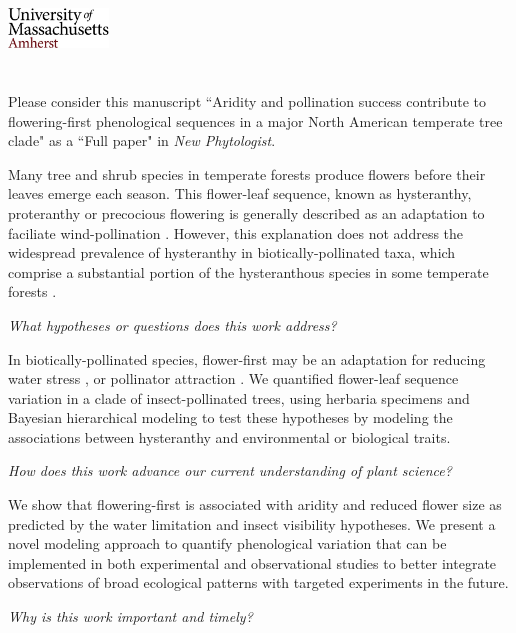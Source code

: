\documentclass{article}[12pt]
\begin{document}

\noindent\includegraphics[width=0.2\textwidth]{umasslogo}\\\\

\\


\noindent Please consider this manuscript ``Aridity and pollination success contribute to flowering-first phenological sequences in a major North American temperate tree clade" as a ``Full paper" in \textit{New Phytologist}.

\noindent Many tree and shrub species in temperate forests produce flowers before their leaves emerge each season. This flower-leaf sequence, known as hysteranthy, proteranthy or precocious flowering is generally described as an adaptation to faciliate wind-pollination \citep{Rathcke_1985}. However, this explanation does not address the widespread prevalence of hysteranthy in biotically-pollinated taxa, which comprise a substantial portion of the hysteranthous species in some temperate forests \citep{Buonaiuto2020}. 

\noindent \emph{What hypotheses or questions does this work address?}

\noindent In biotically-pollinated species, flower-first may be an adaptation for reducing water stress \citep{Gougherty2018}, or pollinator attraction \citep{Janzen1967}. We quantified flower-leaf sequence variation in a clade of insect-pollinated trees, using herbaria specimens and Bayesian hierarchical modeling to test these hypotheses by modeling the associations between hysteranthy and environmental or biological traits.

\noindent \emph{How does this work advance our current understanding of plant science?}

\noindent We show that flowering-first is associated with aridity and reduced flower size as predicted by the water limitation and insect visibility hypotheses. We present a novel modeling approach to quantify phenological variation that can be implemented in both experimental and observational studies to better integrate observations of broad ecological patterns with targeted experiments in the future.

\noindent \emph{Why is this work important and timely?}
\end{document}
